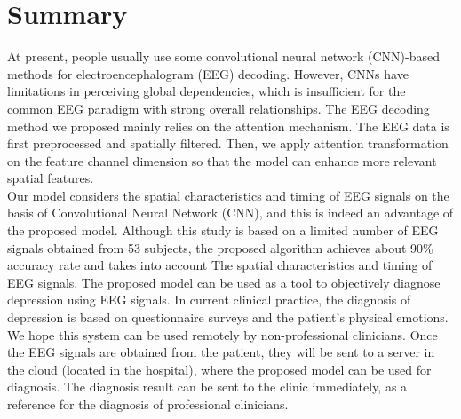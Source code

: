 \documentclass[a0,portrait]{a0poster}
\begin{document}
\begin{minipage}[c]{\linewidth}
\begin{framed}
\begin{multicols}{2}
\begin{center}
\label{GIMlatlon}
\end{center}
\color{Black}
\section*{Summary}
At present, people usually use some convolutional neural network (CNN)-based methods for electroencephalogram (EEG) decoding. However, CNNs have limitations in perceiving global dependencies, which is insufficient for the common EEG paradigm with strong overall relationships. The EEG decoding method we proposed mainly relies on the attention mechanism. The EEG data is first preprocessed and spatially filtered. Then, we apply attention transformation on the feature channel dimension so that the model can enhance more relevant spatial features. \\

Our model considers the spatial characteristics and timing of EEG signals on the basis of Convolutional Neural Network (CNN), and this is indeed an advantage of the proposed model.
Although this study is based on a limited number of EEG signals obtained from 53 subjects, the proposed algorithm achieves about 90\% accuracy rate and takes into account The spatial characteristics and timing of EEG signals. The proposed model can be used as a tool to objectively diagnose depression using EEG signals. In current clinical practice, the diagnosis of depression is based on questionnaire surveys and the patient's physical emotions. We hope this system can be used remotely by non-professional clinicians. Once the EEG signals are obtained from the patient, they will be sent to a server in the cloud (located in the hospital), where the proposed model can be used for diagnosis. The diagnosis result can be sent to the clinic immediately, as a reference for the diagnosis of professional clinicians.\\


\end{multicols}
\end{framed}
\end{minipage}
\end{document}
